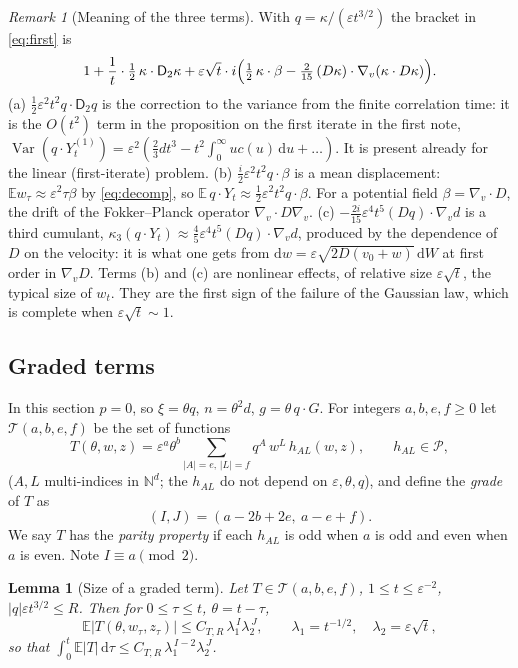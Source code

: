 \documentclass[11pt]{article}
\newcommand{\dd}{\mathrm{d}}
\newcommand{\E}{\mathbb{E}}
\newcommand{\eps}{\varepsilon}
\newcommand{\cP}{\mathcal{P}}
\newcommand{\cT}{\mathcal{T}}
\newcommand{\sD}{\mathsf{D}}
\newtheorem{lemma}[theorem]{Lemma}
\theoremstyle{remark}
\newtheorem{remark}[theorem]{Remark}
\begin{document}
\begin{remark}[Meaning of the three terms]\label{rem:terms}
With $q = \kappa/(\eps t^{3/2})$ the bracket in \eqref{eq:first} is
\[
  1 + \frac1t\cdot\tfrac12\,\kappa\cdot\sD_2\kappa
    + \eps\sqrt t\cdot i\Bigl(\tfrac12\,\kappa\cdot\beta
      - \tfrac2{15}\,(D\kappa)\cdot\nabla_v(\kappa\cdot D\kappa)\Bigr).
\]
(a) $\tfrac12\eps^2t^2q\cdot\sD_2q$ is the correction to the variance from the
finite correlation time: it is the $O(t^2)$ term in the proposition on the first iterate in the
first note, $\operatorname{Var}(q\cdot Y^{(1)}_t) = \eps^2(\tfrac23dt^3
 - t^2\int_0^\infty uc(u)\,\dd u + \dots)$. It is present already for the
linear (first-iterate) problem.
(b) $\tfrac{i}{2}\eps^2t^2q\cdot\beta$ is a mean displacement:
$\E w_\tau\approx\eps^2\tau\beta$ by \eqref{eq:decomp}, so
$\E\,q\cdot Y_t\approx\tfrac12\eps^2t^2q\cdot\beta$. For a potential field
$\beta = \nabla_v\cdot D$, the drift of the Fokker--Planck operator
$\nabla_v\cdot D\nabla_v$.
(c) $-\tfrac{2i}{15}\eps^4t^5(Dq)\cdot\nabla_vd$ is a third cumulant,
$\kappa_3(q\cdot Y_t)\approx\tfrac45\eps^4t^5(Dq)\cdot\nabla_vd$, produced by
the dependence of $D$ on the velocity: it is what one gets from
$\dd w = \eps\sqrt{2D(v_0+w)}\,\dd W$ at first order in $\nabla_vD$.
Terms (b) and (c) are nonlinear effects, of relative size $\eps\sqrt t$, the
typical size of $w_t$. They are the first sign of the failure of the Gaussian
law, which is complete when $\eps\sqrt t\sim1$.
\end{remark}

\subsection{Graded terms}

In this section $p=0$, so $\xi = \theta q$, $n = \theta^2d$,
$g = \theta\,q\cdot G$. For integers $a,b,e,f\ge0$ let $\cT(a,b,e,f)$ be the
set of functions
\[
  T(\theta,w,z) = \eps^a\theta^b\sum_{|A|=e,\,|L|=f}q^A\,w^L\,h_{AL}(w,z),
  \qquad h_{AL}\in\cP,
\]
($A,L$ multi-indices in $\mathbb{N}^d$; the $h_{AL}$ do not depend on
$\eps,\theta,q$), and define the \emph{grade} of $T$ as
\[
  (I,J) = (a-2b+2e,\ a-e+f).
\]
We say $T$ has the \emph{parity property} if each $h_{AL}$ is odd when $a$ is
odd and even when $a$ is even. Note $I\equiv a\pmod2$.

\begin{lemma}[Size of a graded term]\label{lem:size}
Let $T\in\cT(a,b,e,f)$, $1\le t\le\eps^{-2}$, $|q|\eps t^{3/2}\le R$. Then for
$0\le\tau\le t$, $\theta = t-\tau$,
\[
  \E\bigl|T(\theta,w_\tau,z_\tau)\bigr|
  \le C_{T,R}\,\lambda_1^{\,I}\lambda_2^{\,J},\qquad
  \lambda_1 = t^{-1/2},\quad\lambda_2 = \eps\sqrt t,
\]
so that $\int_0^t\E|T|\,\dd\tau\le C_{T,R}\,\lambda_1^{\,I-2}\lambda_2^{\,J}$.
\end{lemma}
\end{document}
